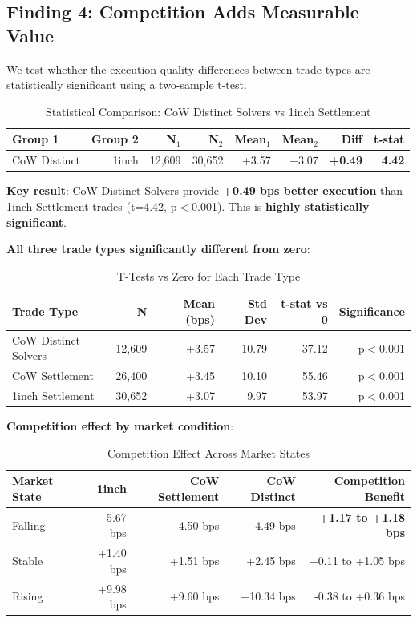 \documentclass[12pt,a4paper]{article}
\begin{document}
\subsection{Finding 4: Competition Adds Measurable Value}

We test whether the execution quality differences between trade types are statistically significant using a two-sample t-test.

\begin{table}[H]
\centering
\caption{Statistical Comparison: CoW Distinct Solvers vs 1inch Settlement}
\label{tab:ttest}
\begin{tabular}{lrrrrrrr}
\toprule
\textbf{Group 1} & \textbf{Group 2} & \textbf{N$_1$} & \textbf{N$_2$} & \textbf{Mean$_1$} & \textbf{Mean$_2$} & \textbf{Diff} & \textbf{t-stat} \\
\midrule
CoW Distinct & 1inch & 12,609 & 30,652 & +3.57 & +3.07 & \textbf{+0.49} & \textbf{4.42} \\
\bottomrule
\end{tabular}
\end{table}

\textbf{Key result}: CoW Distinct Solvers provide \textbf{+0.49 bps better execution} than 1inch Settlement trades (t=4.42, p$<$0.001). This is \textbf{highly statistically significant}.

\textbf{All three trade types significantly different from zero}:

\begin{table}[H]
\centering
\caption{T-Tests vs Zero for Each Trade Type}
\label{tab:ttest_zero}
\begin{tabular}{lrrrrr}
\toprule
\textbf{Trade Type} & \textbf{N} & \textbf{Mean (bps)} & \textbf{Std Dev} & \textbf{t-stat vs 0} & \textbf{Significance} \\
\midrule
CoW Distinct Solvers & 12,609 & +3.57 & 10.79 & 37.12 & p$<$0.001 \\
CoW Settlement & 26,400 & +3.45 & 10.10 & 55.46 & p$<$0.001 \\
1inch Settlement & 30,652 & +3.07 & 9.97 & 53.97 & p$<$0.001 \\
\bottomrule
\end{tabular}
\end{table}

\textbf{Competition effect by market condition}:

\begin{table}[H]
\centering
\caption{Competition Effect Across Market States}
\label{tab:competition_by_market}
\begin{tabular}{lrrrr}
\toprule
\textbf{Market State} & \textbf{1inch} & \textbf{CoW Settlement} & \textbf{CoW Distinct} & \textbf{Competition Benefit} \\
\midrule
Falling & -5.67 bps & -4.50 bps & -4.49 bps & \textbf{+1.17 to +1.18 bps} \\
Stable & +1.40 bps & +1.51 bps & +2.45 bps & +0.11 to +1.05 bps \\
Rising & +9.98 bps & +9.60 bps & +10.34 bps & -0.38 to +0.36 bps \\
\bottomrule
\end{tabular}
\end{table}
\end{document}
